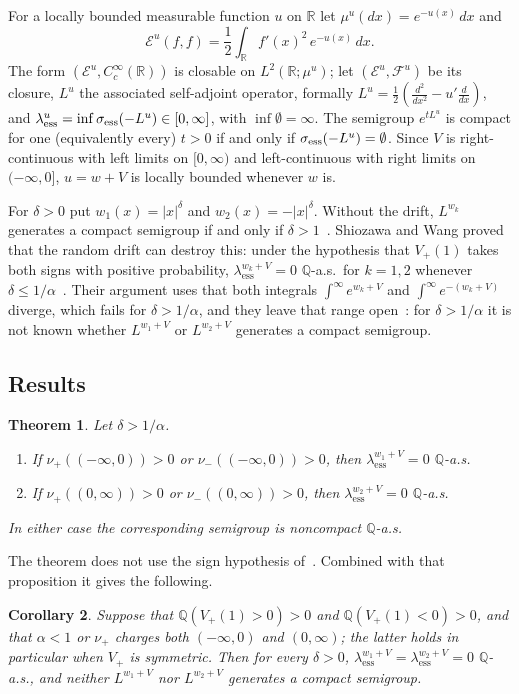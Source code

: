 \documentclass[11pt]{amsart}
\newtheorem{theorem}{Theorem}[section]
\newtheorem{corollary}[theorem]{Corollary}
\theoremstyle{remark}
\newcommand{\R}{\mathbb R}
\newcommand{\Q}{\mathbb Q}
\newcommand{\cE}{\mathcal E}
\newcommand{\cF}{\mathcal F}
\newcommand{\essbot}{\lambda_{\mathrm{ess}}}
\begin{document}
For a locally bounded measurable function $u$ on $\R$ let $\mu^u(dx)=e^{-u(x)}\,dx$ and
\[
\cE^u(f,f)=\frac12\int_\R f'(x)^2\,e^{-u(x)}\,dx .
\]
The form $(\cE^u,C_c^\infty(\R))$ is closable on $L^2(\R;\mu^u)$; let $(\cE^u,\cF^u)$ be its closure, $L^u$ the associated self-adjoint operator, formally $L^u=\frac12(\frac{d^2}{dx^2}-u'\frac{d}{dx})$, and $\essbot^u=\inf\sigma_{\rm ess}(-L^u)\in[0,\infty]$, with $\inf\emptyset=\infty$. The semigroup $e^{tL^u}$ is compact for one (equivalently every) $t>0$ if and only if $\sigma_{\rm ess}(-L^u)=\emptyset$. Since $V$ is right-continuous with left limits on $[0,\infty)$ and left-continuous with right limits on $(-\infty,0]$, $u=w+V$ is locally bounded whenever $w$ is.

For $\delta>0$ put $w_1(x)=|x|^\delta$ and $w_2(x)=-|x|^\delta$. Without the drift, $L^{w_k}$ generates a compact semigroup if and only if $\delta>1$~\cite[Section~2]{SW}. Shiozawa and Wang proved that the random drift can destroy this: under the hypothesis that $V_+(1)$ takes both signs with positive probability, $\essbot^{w_k+V}=0$ $\Q$-a.s.\ for $k=1,2$ whenever $\delta\le1/\alpha$~\cite[Proposition~5.2]{SW}. Their argument uses that both integrals $\int^\infty e^{w_k+V}$ and $\int^\infty e^{-(w_k+V)}$ diverge, which fails for $\delta>1/\alpha$, and they leave that range open~\cite[Remark~5.3(ii)]{SW}: for $\delta>1/\alpha$ it is not known whether $L^{w_1+V}$ or $L^{w_2+V}$ generates a compact semigroup.

\subsection*{Results}

\begin{theorem}\label{thm:main}
Let $\delta>1/\alpha$.
\begin{enumerate}[label=\textup{(\alph*)}]
\item If $\nu_+((-\infty,0))>0$ or $\nu_-((-\infty,0))>0$, then $\essbot^{w_1+V}=0$ $\Q$-a.s.
\item If $\nu_+((0,\infty))>0$ or $\nu_-((0,\infty))>0$, then $\essbot^{w_2+V}=0$ $\Q$-a.s.
\end{enumerate}
In either case the corresponding semigroup is noncompact $\Q$-a.s.
\end{theorem}

The theorem does not use the sign hypothesis of~\cite[Proposition~5.2]{SW}. Combined with that proposition it gives the following.

\begin{corollary}\label{cor:both}
Suppose that $\Q(V_+(1)>0)>0$ and $\Q(V_+(1)<0)>0$, and that $\alpha<1$ or $\nu_+$ charges both $(-\infty,0)$ and $(0,\infty)$; the latter holds in particular when $V_+$ is symmetric. Then for every $\delta>0$, $\essbot^{w_1+V}=\essbot^{w_2+V}=0$ $\Q$-a.s., and neither $L^{w_1+V}$ nor $L^{w_2+V}$ generates a compact semigroup.
\end{corollary}
\end{document}

